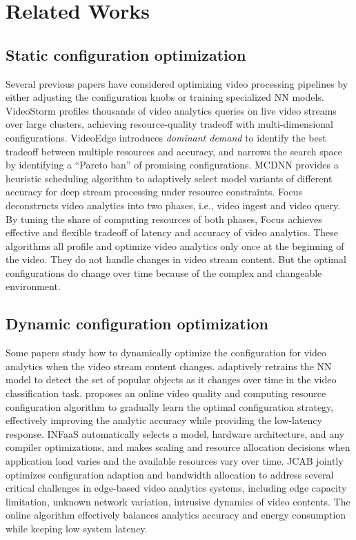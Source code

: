 \section{Related Works}
\label{Section: related_works}

\subsection{Static configuration optimization} 
Several previous papers have considered optimizing video processing pipelines by either adjusting the configuration knobs or training specialized NN models. VideoStorm \cite{zhang2017videostorm} profiles thousands of video analytics queries on live video streams over large clusters, achieving resource-quality tradeoff with multi-dimensional configurations. VideoEdge \cite{hung2018videoedge} introduces \emph{dominant demand} to identify the best tradeoff between multiple resources and accuracy, and narrows the search space by identifying a ``Pareto ban'' of promising configurations. MCDNN \cite{han2016mcdnn} provides a heuristic scheduling algorithm to adaptively select model variants of different accuracy for
deep stream processing under resource constraints. Focus \cite{hsieh2018focus} deconstructs video analytics into two phases, i.e., video ingest and video query. By tuning the share of computing resources of both phases, Focus achieves effective and flexible tradeoff of latency and accuracy of video analytics. These algorithms all profile and optimize video analytics only once at the beginning of the video. They do not handle changes in video stream content. But the optimal configurations do change over time because of the complex and changeable environment.

\subsection{Dynamic configuration optimization}
Some papers study how to dynamically optimize the configuration for video analytics when the video stream content changes.
\cite{shen2017retrain_model} adaptively retrains the NN model to detect the set of popular objects as it changes over time in the video classification task. \cite{yang2019edge_coordinated} proposes an online video quality and computing resource configuration algorithm to gradually learn the optimal configuration strategy, effectively improving the analytic accuracy while providing the low-latency response. INFaaS \cite{romero2019infaas} automatically selects a model, hardware architecture, and any compiler optimizations, and makes scaling and resource allocation decisions when application load varies and the available resources vary over time. JCAB \cite{wang2020jcab} jointly optimizes
configuration adaption and bandwidth allocation to address several critical challenges in edge-based video analytics systems,
including edge capacity limitation, unknown network variation,
intrusive dynamics of video contents. The online algorithm effectively balances analytics accuracy and energy
consumption while keeping low system latency.
 
